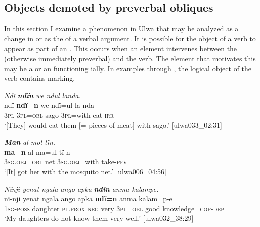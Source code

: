 \subsection{Objects demoted by preverbal obliques}\label{sec:13.8.9}


In this section I examine a phenomenon in Ulwa that may be analyzed as a change in  or as the  of a verbal argument. It is possible for the  object of a verb to appear as part of an  . This occurs when an element intervenes between the (otherwise immediately preverbal)  and the verb. The element that motivates this  may be a  or an  functioning ially. In examples  through , the logical object of the verb contains  marking.

\ea%
    \label{ex:syntax:344}
          \textit{Ndï} \textbf{\textit{ndïn}} \textit{we ndul landa.}\\
\gll    ndï  \textbf{ndï=n}    we    ndï=ul    la-nda\\
    3\textsc{pl}  3\textsc{pl=obl}  sago  3\textsc{pl}=with  eat-\textsc{irr}\\
\glt `[They] would eat them [= pieces of meat] with sago.’ [ulwa033\_02:31]
\z

\ea%
    \label{ex:syntax:345}
          \textbf{\textit{Man}} \textit{al mol tïn.}\\
\gll \textbf{ma=n}      al  ma=ul      tï-n\\
    3\textsc{sg.obj=obl}  net  3\textsc{sg.obj}=with  take-\textsc{pfv}\\
\glt `[It] got her with the mosquito net.’ [ulwa006\_04:56]
\z

\ea%
    \label{ex:syntax:346}
          \textit{Nïnji yenat ngala ango apka} \textbf{\textit{ndïn}} \textit{anma kalampe.}\\
\gll    nï-nji    yenat    ngala    ango  apka  \textbf{ndï=n}    anma kalam=p-e\\
    1\textsc{sg-poss}  daughter  \textsc{pl.prox}  \textsc{neg}  very  3\textsc{pl=obl}  good    knowledge=\textsc{cop-dep}\\
\glt `My daughters do not know them very well.’ [ulwa032\_38:29]
\z

